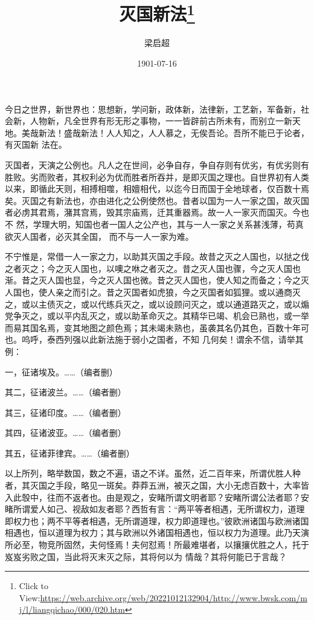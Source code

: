 \documentclass{article}
\title{灭国新法\footnote{Click to View:\url{https://web.archive.org/web/20221012132904/http://www.bwsk.com/mj/l/liangqichao/000/020.htm}}}
\author{梁启超}
\date{1901-07-16}
\begin{document}

\maketitle


\Large

﻿今日之世界，新世界也：思想新，学问新，政体新，法律新，工艺新，军备新，社会新，人物新，凡全世界有形无形之事物，一一皆辟前古所未有，而别立一新天地。美哉新法！盛哉新法！人人知之，人人慕之，无俟吾论。吾所不能已于论者，有灭国新
法在。 

灭国者，天演之公例也。凡人之在世间，必争自存，争自存则有优劣，有优劣则有胜败。劣而败者，其权利必为优而胜者所吞并，是即灭国之理也。自世界初有人类以来，即循此天则，相搏相噬，相嬗相代，以迄今日而国于全地球者，仅百数十焉矣。灭国之有新法也，亦由进化之公例使然也。昔者以国为一人一家之国，故灭国者必虏其君焉，潴其宫焉，毁其宗庙焉，迁其重器焉。故一人一家灭而国灭。今也不
\newpage
然，学理大明，知国也者一国人之公产也，其与一人一家之关系甚浅薄，苟真欲灭人国者，必灭其全国，
而不与一人一家为难。 

不宁惟是，常借一人一家之力，以助其灭国之手段。故昔之灭之人国也，以挞之伐之者灭之；今之灭人国也，以噢之咻之者灭之。昔之灭人国也骤，今之灭人国也渐。昔之灭人国也显，今之灭人国也微。昔之灭人国也，使人知之而备之；今之灭人国也，使人亲之而引之。昔之灭国者如虎狼，今之灭国者如狐狸。或以通商灭之，或以主债灭之，或以代练兵灭之，或以设顾问灭之，或以通道路灭之，或以煽党争灭之，或以平内乱灭之，或以助革命灭之。其精华已竭、机会已熟也，或一举而易其国名焉，变其地图之颜色焉；其未竭未熟也，虽袭其名仍其色，百数十年可也。呜呼，泰西列强以此新法施于弱小之国者，不知
几何矣！谓余不信，请举其例： 


一，征诸埃及。……（编者删） 


\newpage

其二，征诸波兰。……（编者删） 


其三，征诸印度。……（编者删） 


其四，征诸波亚。……（编者删） 


其五，征诸菲律宾。……（编者删） 

以上所列，略举数国，数之不遍，语之不详。虽然，近二百年来，所谓优胜人种者，其灭国之手段，略见一斑矣。莽莽五洲，被灭之国，大小无虑百数十，大率皆入此彀中，往而不返者也。由是观之，安睹所谓文明者耶？安睹所谓公法者耶？安睹所谓爱人如己、视敌如友者耶？西哲有言：“两平等者相遇，无所谓权力，道理即权力也；两不平等者相遇，无所谓道理，权力即道理也。”彼欧洲诸国与欧洲诸国相遇也，恒以道理为权力；其与欧洲以外诸国相遇也，恒以权力为道理。此乃天演所必至，物竞所固然，夫何怪焉！夫何怼焉！所最难堪者，以攘攘优胜之人，托于岌岌劣败之国，当此将灭末灭之际，其将何以为
情哉？其将何能已于言哉？ 
\end{document}
